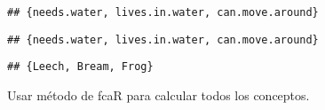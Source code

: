 \documentclass[
]{book}
\newenvironment{Shaded}{\begin{snugshade}}{\end{snugshade}}
\newcommand{\AttributeTok}[1]{\textcolor[rgb]{0.77,0.63,0.00}{#1}}
\newcommand{\DecValTok}[1]{\textcolor[rgb]{0.00,0.00,0.81}{#1}}
\newcommand{\FunctionTok}[1]{\textcolor[rgb]{0.00,0.00,0.00}{#1}}
\newcommand{\NormalTok}[1]{#1}
\newcommand{\OtherTok}[1]{\textcolor[rgb]{0.56,0.35,0.01}{#1}}
\newcommand{\SpecialCharTok}[1]{\textcolor[rgb]{0.00,0.00,0.00}{#1}}
\begin{document}
\begin{verbatim}
## {needs.water, lives.in.water, can.move.around}
\end{verbatim}

\begin{Shaded}
\end{Shaded}

\begin{verbatim}
## {needs.water, lives.in.water, can.move.around}
\end{verbatim}

\begin{Shaded}
\end{Shaded}

\begin{verbatim}
## {Leech, Bream, Frog}
\end{verbatim}

Usar método de fcaR para calcular todos los conceptos.

\begin{Shaded}
\end{Shaded}
\end{document}
